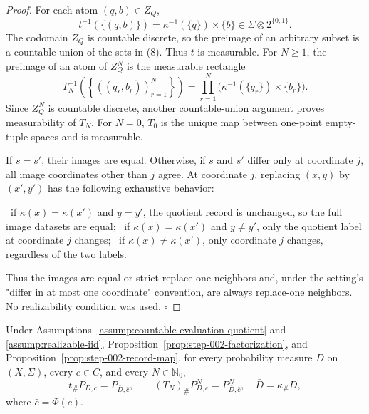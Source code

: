 \begin{proof}
For each atom \((q,b)\in Z_Q\),
\[
t^{-1}(\{(q,b)\})=\kappa^{-1}(\{q\})\times\{b\}
\in\Sigma\otimes2^{\{0,1\}}.
\tag{8}
\]
The codomain \(Z_Q\) is countable discrete, so the preimage of an arbitrary
subset is a countable union of the sets in (8). Thus \(t\) is measurable.
For \(N\ge1\), the preimage of an atom of \(Z_Q^N\) is the measurable
rectangle
\[
T_N^{-1}\!\left(
 \left\{((q_r,b_r))_{r=1}^N\right\}
\right)
=\prod_{r=1}^N
  \bigl(\kappa^{-1}(\{q_r\})\times\{b_r\}\bigr).
\tag{9}
\]
Since \(Z_Q^N\) is countable discrete, another countable-union argument
proves measurability of \(T_N\). For \(N=0\), \(T_0\) is the unique map
between one-point empty-tuple spaces and is measurable.

If \(s=s'\), their images are equal. Otherwise, if \(s\) and \(s'\) differ
only at coordinate \(j\), all image coordinates
other than \(j\) agree. At coordinate \(j\), replacing \((x,y)\) by
\((x',y')\) has the following exhaustive behavior:

\noindent\textbullet\ if \(\kappa(x)=\kappa(x')\) and \(y=y'\), the quotient record is unchanged,
  so the full image datasets are equal;
\noindent\textbullet\ if \(\kappa(x)=\kappa(x')\) and \(y\ne y'\), only the quotient label at
  coordinate \(j\) changes;
\noindent\textbullet\ if \(\kappa(x)\ne\kappa(x')\), only coordinate \(j\) changes, regardless of
  the two labels.

Thus the images are equal or strict replace-one neighbors and, under the
setting's "differ in at most one coordinate" convention, are always
replace-one neighbors. No realizability condition was used. \(\square\)


\end{proof}

\begin{proposition}\label{prop:step-002-iid-pushforward}
Under Assumptions~\ref{assump:countable-evaluation-quotient} and
\ref{assump:realizable-iid}, Proposition~\ref{prop:step-002-factorization},
and Proposition~\ref{prop:step-002-record-map}, for every probability measure
\(D\) on \((X,\Sigma)\), every \(c\in C\), and every
\(N\in\mathbb N_0\),
\[
t_\#P_{D,c}=P_{\bar D,\bar c},
\qquad
(T_N)_\#P_{D,c}^N=P_{\bar D,\bar c}^N,
\quad \bar D=\kappa_\#D,
\tag{10}
\]
where \(\bar c=\Phi(c)\).


\end{proposition}

